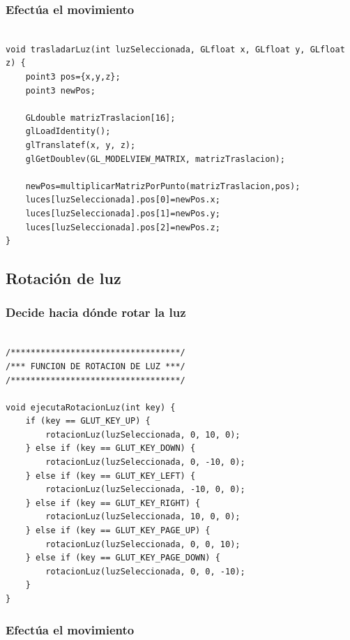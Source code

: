 \documentclass[12pt,a4paper]{article}
\begin{document}
\subsubsection{Efectúa el movimiento}

\begin{lstlisting}

void trasladarLuz(int luzSeleccionada, GLfloat x, GLfloat y, GLfloat z) {
    point3 pos={x,y,z};
    point3 newPos;

    GLdouble matrizTraslacion[16];
    glLoadIdentity();
    glTranslatef(x, y, z);
    glGetDoublev(GL_MODELVIEW_MATRIX, matrizTraslacion);

    newPos=multiplicarMatrizPorPunto(matrizTraslacion,pos);
    luces[luzSeleccionada].pos[0]=newPos.x;
    luces[luzSeleccionada].pos[1]=newPos.y;
    luces[luzSeleccionada].pos[2]=newPos.z;
}

\end{lstlisting}

\newpage
\subsection{Rotación de luz}

\subsubsection{Decide hacia dónde rotar la luz}
\begin{lstlisting}

/**********************************/
/*** FUNCION DE ROTACION DE LUZ ***/
/**********************************/

void ejecutaRotacionLuz(int key) {
    if (key == GLUT_KEY_UP) {
        rotacionLuz(luzSeleccionada, 0, 10, 0);
    } else if (key == GLUT_KEY_DOWN) {
        rotacionLuz(luzSeleccionada, 0, -10, 0);
    } else if (key == GLUT_KEY_LEFT) {
        rotacionLuz(luzSeleccionada, -10, 0, 0);
    } else if (key == GLUT_KEY_RIGHT) {
        rotacionLuz(luzSeleccionada, 10, 0, 0);
    } else if (key == GLUT_KEY_PAGE_UP) {
        rotacionLuz(luzSeleccionada, 0, 0, 10);
    } else if (key == GLUT_KEY_PAGE_DOWN) {
        rotacionLuz(luzSeleccionada, 0, 0, -10);
    }
}

\end{lstlisting}

\subsubsection{Efectúa el movimiento}
\end{document}
